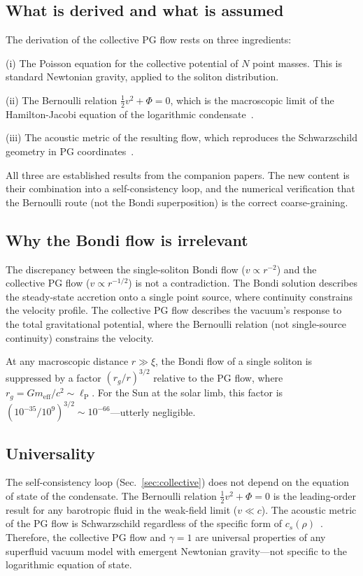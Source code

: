 \documentclass[12pt, a4paper]{article}
\newcommand{\meff}{m_{\mathrm{eff}}}
\newcommand{\lP}{\ell_{\mathrm{P}}}
\begin{document}
\subsection{What is derived and what is assumed}

The derivation of the collective PG flow rests on
three ingredients:

(i) The Poisson equation for the collective potential
of $N$ point masses. This is standard Newtonian
gravity, applied to the soliton distribution.

(ii) The Bernoulli relation
$\tfrac{1}{2}v^2 + \Phi = 0$, which is the
macroscopic limit of the Hamilton-Jacobi equation
of the logarithmic condensate~\cite{kulangiev_2026a}.

(iii) The acoustic metric of the resulting flow,
which reproduces the Schwarzschild geometry in PG
coordinates~\cite{visser_1998}.

All three are established results from the companion
papers. The new content is their combination into a
self-consistency loop, and the numerical verification
that the Bernoulli route (not the Bondi superposition)
is the correct coarse-graining.

\subsection{Why the Bondi flow is irrelevant}

The discrepancy between the single-soliton Bondi flow
($v \propto r^{-2}$) and the collective PG flow
($v \propto r^{-1/2}$) is not a contradiction. The
Bondi solution describes the steady-state accretion
onto a single point source, where continuity constrains
the velocity profile. The collective PG flow describes
the vacuum's response to the total gravitational
potential, where the Bernoulli relation (not
single-source continuity) constrains the velocity.

At any macroscopic distance $r \gg \xi$, the Bondi
flow of a single soliton is suppressed by a factor
$(r_g/r)^{3/2}$ relative to the PG flow, where
$r_g = G\meff/c^2 \sim \lP$. For the Sun at the
solar limb, this factor is $(10^{-35}/10^{9})^{3/2}
\sim 10^{-66}$---utterly negligible.

\subsection{Universality}

The self-consistency loop
(Sec.~\ref{sec:collective}) does not depend on the
equation of state of the condensate. The Bernoulli
relation $\tfrac{1}{2}v^2 + \Phi = 0$ is the leading-order
result for any barotropic fluid in the weak-field
limit ($v \ll c$). The acoustic metric of the PG
flow is Schwarzschild regardless of the specific form
of $c_s(\rho)$~\cite{kulangiev_2026a}. Therefore,
the collective PG flow and $\gamma = 1$ are universal
properties of any superfluid vacuum model with
emergent Newtonian gravity---not specific to the
logarithmic equation of state.
\end{document}

